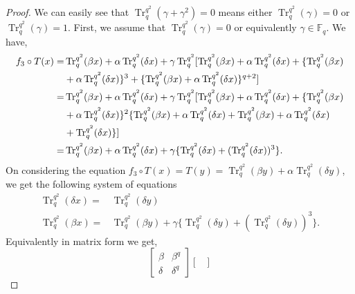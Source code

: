 \documentclass[10pt,a4paper]{amsart}
\begin{document}
\begin{proof} We can easily see that $\operatorname{Tr}_{q}^{q^2}(\gamma+\gamma^2)=0$ means either $\operatorname{Tr}_{q}^{q^2}(\gamma)=0$ or $\operatorname{Tr}_{q}^{q^2}(\gamma)=1$. First, we assume that $\operatorname{Tr}_{q}^{q^2}(\gamma)=0$ or equivalently $\gamma \in \mathbb{F}_{q}$. We have,
	\begin{align}
		f_3\circ T(x)=&\operatorname{Tr}_{q}^{q^2}(\beta x)+\alpha\operatorname{Tr}_{q}^{q^2}(\delta x)+\gamma\operatorname{Tr}_{q}^{q^2}[\operatorname{Tr}_{q}^{q^2}(\beta x)+\alpha\operatorname{Tr}_{q}^{q^2}(\delta x)+\{\operatorname{Tr}_{q}^{q^2}(\beta x)\notag\\&+\alpha\operatorname{Tr}_{q}^{q^2}(\delta x)\}^3+\{\operatorname{Tr}_{q}^{q^2}(\beta x)+\alpha\operatorname{Tr}_{q}^{q^2}(\delta x)\}^{q+2}]\notag\\
		=&\operatorname{Tr}_{q}^{q^2}(\beta x)+\alpha\operatorname{Tr}_{q}^{q^2}(\delta x)+\gamma\operatorname{Tr}_{q}^{q^2}[\operatorname{Tr}_{q}^{q^2}(\beta x)+\alpha\operatorname{Tr}_{q}^{q^2}(\delta x)+\{\operatorname{Tr}_{q}^{q^2}(\beta x)\notag\\&+\alpha\operatorname{Tr}_{q}^{q^2}(\delta x)\}^2\{\operatorname{Tr}_{q}^{q^2}(\beta x)+\alpha\operatorname{Tr}_{q}^{q^2}(\delta x)+\operatorname{Tr}_{q}^{q^2}(\beta x)+\alpha\operatorname{Tr}_{q}^{q^2}(\delta x)\notag\\&+\operatorname{Tr}_{q}^{q^2}(\delta x)\}]\notag\\
		=&\operatorname{Tr}_{q}^{q^2}(\beta x)+\alpha\operatorname{Tr}_{q}^{q^2}(\delta x)+\gamma\{\operatorname{Tr}_{q}^{q^2}(\delta x)+(\operatorname{Tr}_{q}^{q^2}(\delta x))^3\}.\label{3a}
	\end{align}
	On considering the equation $f_3 \circ T(x)=T(y)=\operatorname{Tr}_{q}^{q^2}(\beta y)+\alpha\operatorname{Tr}_{q}^{q^2}(\delta y)$, we get the following system of equations
	\begin{align*}
		\operatorname{Tr}_{q}^{q^2}(\delta x)=&\operatorname{Tr}_{q}^{q^2}(\delta y)\\
		\operatorname{Tr}_{q}^{q^2}(\beta x)=&\operatorname{Tr}_{q}^{q^2}(\beta y)+\gamma\{\operatorname{Tr}_{q}^{q^2}(\delta y)+(\operatorname{Tr}_{q}^{q^2}(\delta y))^3\}.
	\end{align*}
	Equivalently in matrix form we get,
	$$\begin{bmatrix}
		\beta&\beta^{q}\\
		\delta&\delta^{q}
	\end{bmatrix}
	\begin{bmatrix}

\end{bmatrix}$$
\end{proof}
\end{document}
